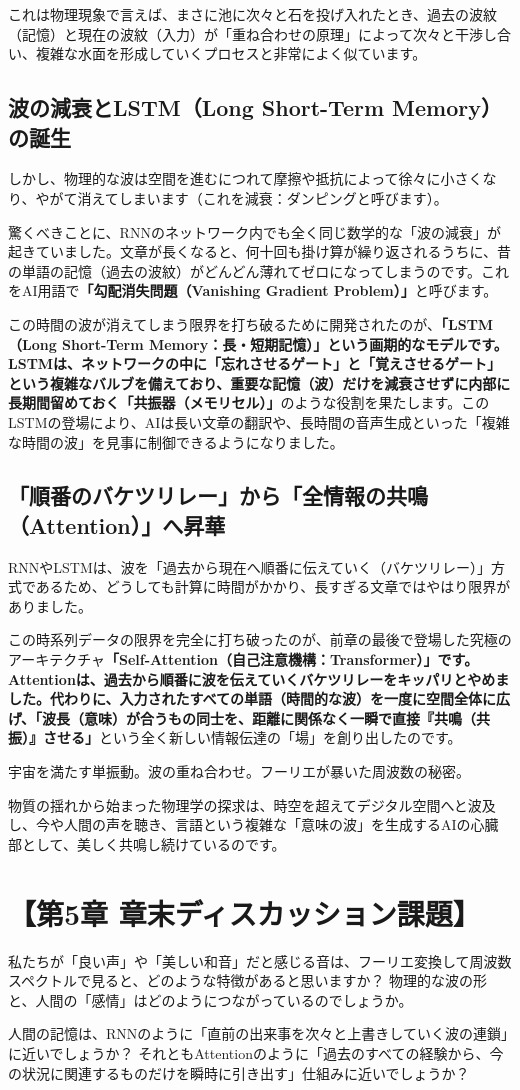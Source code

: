 これは物理現象で言えば、まさに池に次々と石を投げ入れたとき、過去の波紋（記憶）と現在の波紋（入力）が「重ね合わせの原理」によって次々と干渉し合い、複雑な水面を形成していくプロセスと非常によく似ています。

\subsection{波の減衰とLSTM（Long Short-Term Memory）の誕生}

しかし、物理的な波は空間を進むにつれて摩擦や抵抗によって徐々に小さくなり、やがて消えてしまいます（これを減衰：ダンピングと呼びます）。

驚くべきことに、RNNのネットワーク内でも全く同じ数学的な「波の減衰」が起きていました。文章が長くなると、何十回も掛け算が繰り返されるうちに、昔の単語の記憶（過去の波紋）がどんどん薄れてゼロになってしまうのです。これをAI用語で\textbf{「勾配消失問題（Vanishing Gradient Problem）」}と呼びます。

この時間の波が消えてしまう限界を打ち破るために開発されたのが、\textbf{「LSTM（Long Short-Term Memory：長・短期記憶）」という画期的なモデルです。 LSTMは、ネットワークの中に「忘れさせるゲート」と「覚えさせるゲート」という複雑なバルブを備えており、重要な記憶（波）だけを減衰させずに内部に長期間留めておく「共振器（メモリセル）」}のような役割を果たします。このLSTMの登場により、AIは長い文章の翻訳や、長時間の音声生成といった「複雑な時間の波」を見事に制御できるようになりました。

\subsection{「順番のバケツリレー」から「全情報の共鳴（Attention）」へ昇華}

RNNやLSTMは、波を「過去から現在へ順番に伝えていく（バケツリレー）」方式であるため、どうしても計算に時間がかかり、長すぎる文章ではやはり限界がありました。

この時系列データの限界を完全に打ち破ったのが、前章の最後で登場した究極のアーキテクチャ\textbf{「Self-Attention（自己注意機構：Transformer）」です。 Attentionは、過去から順番に波を伝えていくバケツリレーをキッパリとやめました。代わりに、入力されたすべての単語（時間的な波）を一度に空間全体に広げ、「波長（意味）が合うもの同士を、距離に関係なく一瞬で直接『共鳴（共振）』させる」}という全く新しい情報伝達の「場」を創り出したのです。

宇宙を満たす単振動。波の重ね合わせ。フーリエが暴いた周波数の秘密。

物質の揺れから始まった物理学の探求は、時空を超えてデジタル空間へと波及し、今や人間の声を聴き、言語という複雑な「意味の波」を生成するAIの心臓部として、美しく共鳴し続けているのです。

\section*{【第5章 章末ディスカッション課題】}

私たちが「良い声」や「美しい和音」だと感じる音は、フーリエ変換して周波数スペクトルで見ると、どのような特徴があると思いますか？ 物理的な波の形と、人間の「感情」はどのようにつながっているのでしょうか。

人間の記憶は、RNNのように「直前の出来事を次々と上書きしていく波の連鎖」に近いでしょうか？ それともAttentionのように「過去のすべての経験から、今の状況に関連するものだけを瞬時に引き出す」仕組みに近いでしょうか？




